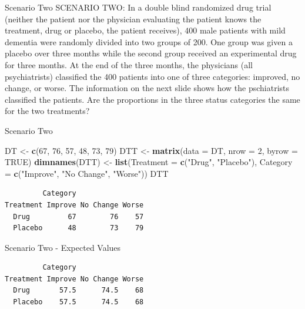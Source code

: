 \documentclass[
  ignorenonframetext,
]{beamer}
\newenvironment{Shaded}{\begin{snugshade}}{\end{snugshade}}
\newcommand{\AttributeTok}[1]{\textcolor[rgb]{0.13,0.29,0.53}{#1}}
\newcommand{\ConstantTok}[1]{\textcolor[rgb]{0.56,0.35,0.01}{#1}}
\newcommand{\DecValTok}[1]{\textcolor[rgb]{0.00,0.00,0.81}{#1}}
\newcommand{\FunctionTok}[1]{\textcolor[rgb]{0.13,0.29,0.53}{\textbf{#1}}}
\newcommand{\NormalTok}[1]{#1}
\newcommand{\OtherTok}[1]{\textcolor[rgb]{0.56,0.35,0.01}{#1}}
\newcommand{\SpecialCharTok}[1]{\textcolor[rgb]{0.81,0.36,0.00}{\textbf{#1}}}
\newcommand{\StringTok}[1]{\textcolor[rgb]{0.31,0.60,0.02}{#1}}
\begin{document}
\begin{frame}{Scenario Two}
\protect\hypertarget{scenario-two}{}
SCENARIO TWO: In a double blind randomized drug trial (neither the
patient nor the physician evaluating the patient knows the treatment,
drug or placebo, the patient receives), 400 male patients with mild
dementia were randomly divided into two groups of 200. One group was
given a placebo over three months while the second group received an
experimental drug for three months. At the end of the three months, the
physicians (all psychiatrists) classified the 400 patients into one of
three categories: improved, no change, or worse. The information on the
next slide shows how the pschiatrists classified the patients. Are the
proportions in the three status categories the same for the two
treatments?
\end{frame}

\begin{frame}[fragile]{Scenario Two}
\protect\hypertarget{scenario-two-1}{}
\begin{Shaded}
\begin{Highlighting}[]
\NormalTok{DT }\OtherTok{\textless{}{-}} \FunctionTok{c}\NormalTok{(}\DecValTok{67}\NormalTok{, }\DecValTok{76}\NormalTok{, }\DecValTok{57}\NormalTok{, }\DecValTok{48}\NormalTok{, }\DecValTok{73}\NormalTok{, }\DecValTok{79}\NormalTok{)}
\NormalTok{DTT }\OtherTok{\textless{}{-}} \FunctionTok{matrix}\NormalTok{(}\AttributeTok{data =}\NormalTok{ DT, }\AttributeTok{nrow =} \DecValTok{2}\NormalTok{, }\AttributeTok{byrow =} \ConstantTok{TRUE}\NormalTok{)}
\FunctionTok{dimnames}\NormalTok{(DTT) }\OtherTok{\textless{}{-}} \FunctionTok{list}\NormalTok{(}\AttributeTok{Treatment =} \FunctionTok{c}\NormalTok{(}\StringTok{"Drug"}\NormalTok{, }\StringTok{"Placebo"}\NormalTok{),}
   \AttributeTok{Category =} \FunctionTok{c}\NormalTok{(}\StringTok{"Improve"}\NormalTok{, }\StringTok{"No Change"}\NormalTok{, }\StringTok{"Worse"}\NormalTok{))}
\NormalTok{DTT}
\end{Highlighting}
\end{Shaded}

\begin{verbatim}
         Category
Treatment Improve No Change Worse
  Drug         67        76    57
  Placebo      48        73    79
\end{verbatim}
\end{frame}

\begin{frame}[fragile]{Scenario Two - Expected Values}
\protect\hypertarget{scenario-two---expected-values}{}
\begin{Shaded}
\end{Shaded}

\begin{verbatim}
         Category
Treatment Improve No Change Worse
  Drug       57.5      74.5    68
  Placebo    57.5      74.5    68
\end{verbatim}
\end{frame}
\end{document}
